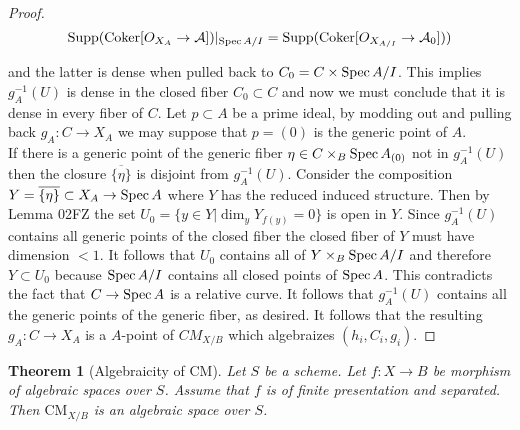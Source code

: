 \documentclass{stacks-project}
\theoremstyle{plain}
\newtheorem{theorem}[subsection]{Theorem}
\theoremstyle{definition}
\DeclareMathOperator{\Spec}{Spec}
\theoremstyle{remark}
\numberwithin{equation}{subsection}
\def\Spec{\mathop{\rm Spec}}
\def\CMfunctor{\mathcal{C}\!{\it oh}}
\def\CMfunctor{\text{CM}}
\begin{document}
\begin{proof}
\[\text{Supp}(\text{Coker}[O_{X_A} \to \mathcal{A}])|_{\Spec A/I}=\text{Supp}(\text{Coker}[O_{X_{A/I}} \to \mathcal{A}_0]))\]

and the latter is dense when pulled back to $C_0=C \times \Spec A/I$. This implies $g_A^{-1}(U)$ is dense in the closed fiber $C_0 \subset C$ and now we must conclude that it is dense in every fiber of $C$. Let $p \subset A$ be a prime ideal, by modding out and pulling back $g_A: C \to X_A$ we may suppose that $p=(0)$ is the generic point of $A$. 
\\

If there is a generic point of the generic fiber $\eta \in C \times_B \Spec A_{(0)}$ not in $g_A^{-1}(U)$ then the closure $\overline{\{\eta\}}$ is disjoint from $g_A^{-1}(U)$. Consider the composition $Y=\overline{\{\eta\}} \subset X_A \to \Spec A$ where $Y$ has the reduced induced structure. Then by Lemma 02FZ the set $U_0=\{y \in Y|\dim_y Y_{f(y)} = 0 \}$ is open in $Y$. Since $g_A^{-1}(U)$ contains all generic points of the closed fiber the closed fiber of $Y$ must have dimension $<1$. It follows that $U_0$ contains all of $Y \times_B \Spec {A/I}$ and therefore $Y \subset U_0$ because $\Spec A/I$ contains all closed points of $\Spec A$. This contradicts the fact that $C \to \Spec A$ is a relative curve. It follows that $g_A^{-1}(U)$ contains all the generic points of the generic fiber, as desired. It follows that the resulting $g_A: C \to X_A$ is a $A$-point of $CM_{X/B}$ which algebraizes $(h_i,C_i,g_i)$. 
\end{proof}

\begin{theorem}[Algebraicity of $\CMfunctor$]
\label{theorem-cm-general}
Let $S$ be a scheme. Let $f : X \to B$ be morphism of algebraic spaces
over $S$. Assume that $f$ is of finite presentation and separated. Then
$\CMfunctor_{X/B}$ is an algebraic space over $S$.
\end{theorem}
\end{document}
